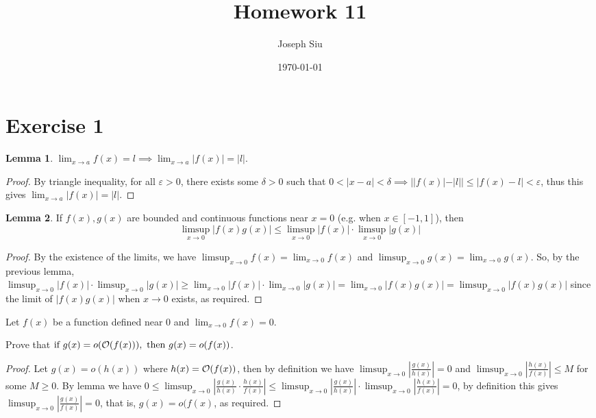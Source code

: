 \documentclass{homework}
\author{Joseph Siu}
\date{\today}
\title{Homework 11}
\newcommand{\ra}{\rightarrow}
\newcommand{\?}{\stackrel{?}{=}}
\newcommand{\ep}{\varepsilon}
\theoremstyle{definition}
\newtheorem*{lemma}{Lemma}
\begin{document}
 \maketitle

\section*{Exercise 1}

\begin{lemma}
    $\lim_{x\to a}f(x)=l \implies \lim_{x\to a}|f(x)|=|l|$. 
        
        \begin{proof}
        By triangle inequality, for all $\ep>0$, there exists some $\delta>0$ such that   $0<|x-a|<\delta\implies||f(x)|-|l||\leq|f(x)-l|<\ep$,  thus this gives $\lim_{x\to a}|f(x)|=|l|$.
    \end{proof}
\end{lemma}

\begin{lemma}
    If $f(x),g(x)$ are bounded and continuous functions near $x=0$ (e.g. when $x\in[-1,1]$), then \[\limsup_{x\to0}|f(x)g(x)|\leq\limsup_{x\to0}|f(x)|\cdot\limsup_{x\to0}|g(x)|\]

    \begin{proof}
              By the existence of the limits, we have $\limsup_{x\to0}f(x)=\lim_{x\to0}f(x)$ and  $\limsup_{x\to0}g(x)=\lim_{x\to0}g(x)$. So,  by the previous lemma,
              \(
              \limsup_{x\to0}|f(x)|\cdot\limsup_{x\to0}|g(x)|\geq\lim_{x\to0}|f(x)|\cdot\lim_{x\to0}|g(x)|=\lim_{x\to0}|f(x)g(x)|=\limsup_{x\to0}|f(x)g(x)|
              \)
             since the limit of $|f(x)g(x)|$ when $x\to0$ exists, as required. 
    \end{proof}
\end{lemma}


Let $f(x)$ be a function defined near 0 and $\displaystyle\lim_{x\to0}f(x)=0$.

\question[1] Prove that $\textup{if~}g(x)=o(\mathcal{O}(f(x))),\mathrm{~then~}g(x)=o(f(x))$. 

\begin{proof}
    Let $g(x)=o(h(x))$ where $h(x)=\cal{O}(f(x))$, then by definition we have $\limsup_{x\to0}|\frac{g(x)}{h(x)}|=0$ and $\limsup_{x\to0}|\frac{h(x)}{f(x)}|\leq M$ for some $M\geq0$. By lemma we have $0\leq\limsup_{x\ra0}|\frac{g(x)}{h(x)}\cdot\frac{h(x)}{f(x)}|\leq\limsup_{x\ra0}|\frac{g(x)}{h(x)}|\cdot\limsup_{x\ra0}|\frac{h(x)}{f(x)}|=0$, by definition this gives $\limsup_{x\ra0}|\frac{g(x)}{f(x)}|=0$, that is, $g(x)=o(f(x)$, as required. 
\end{proof}
\end{document}
